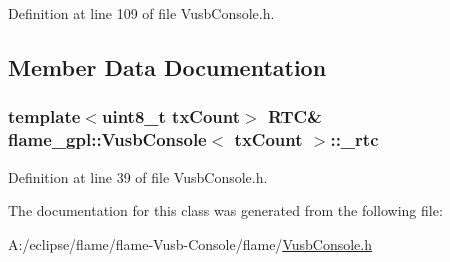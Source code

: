 Definition at line 109 of file Vusb\-Console.\-h.



\subsection{Member Data Documentation}
\hypertarget{classflame__gpl_1_1_vusb_console_a197a4912e9da1bb6a10b13c0f8026e74}{
\subsubsection[{\-\_\-rtc}]{\setlength{\rightskip}{0pt plus 5cm}template$<$uint8\-\_\-t tx\-Count$>$ {\bf R\-T\-C}\& {\bf flame\-\_\-gpl\-::\-Vusb\-Console}$<$ tx\-Count $>$\-::\-\_\-rtc\hspace{0.3cm}{\ttfamily [protected]}}}\label{classflame__gpl_1_1_vusb_console_a197a4912e9da1bb6a10b13c0f8026e74}


Definition at line 39 of file Vusb\-Console.\-h.



The documentation for this class was generated from the following file\-:\begin{DoxyCompactItemize}
\item 
A\-:/eclipse/flame/flame-\/\-Vusb-\/\-Console/flame/\hyperlink{_vusb_console_8h}{Vusb\-Console.\-h}\end{DoxyCompactItemize}
